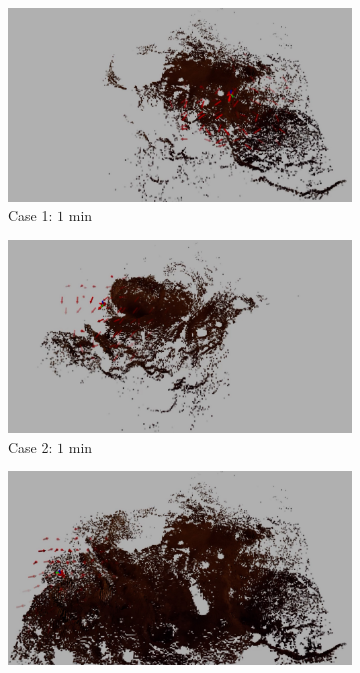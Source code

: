 \documentclass[conf]{new-aiaa}
\begin{document}
\begin{figure}[!t]
	\centering
	\begin{subfigure}[t]{0.4\columnwidth}
           	\centering
          	\includegraphics[height=0.5\textwidth]{MarsFullMap1min.jpg}
        		\caption{Case 1: $1$ min}
		\vspace*{0.025\textwidth}
    	\end{subfigure}
    	\begin{subfigure}[t]{0.4\columnwidth}
           	\centering
          	\includegraphics[height=0.5\textwidth]{MarsRdcdMap1min.jpg}
        		\caption{Case 2: $1$ min}
		\vspace*{0.025\textwidth}
    	\end{subfigure}
	\centering
	\begin{subfigure}[t]{0.4\columnwidth}
           	\centering
          	\includegraphics[height=0.5\textwidth]{MarsFullMap2min.jpg}

\end{subfigure}
\end{figure}
\end{document}
